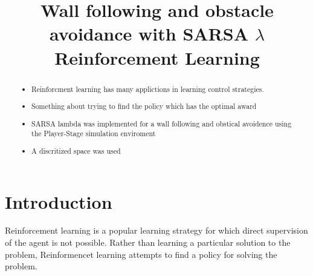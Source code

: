 \documentclass[conference]{IEEEtran}
\begin{document}
%
\title{Wall following and obstacle avoidance with SARSA $\lambda$ Reinforcement Learning}


\author{
}



\maketitle


\begin{abstract}
\boldmath
\begin{itemize}
	\item Reinforcment learning has many applictions in learning control strategies.
	\item Something about trying to find the policy which has the optimal award
	\item SARSA lambda was implemented for a wall following and obstical avoidence using the Player-Stage simulation enviroment
	\item A discritized space was used
\end{itemize}
\end{abstract}
\IEEEpeerreviewmaketitle



\section{Introduction}

Reinforcement learning is a popular learning strategy for which direct supervision of the agent is not possible.  Rather than learning a particular solution to the problem, Reinformencet learning attempts to find a policy for solving the problem.  
\end{document}

